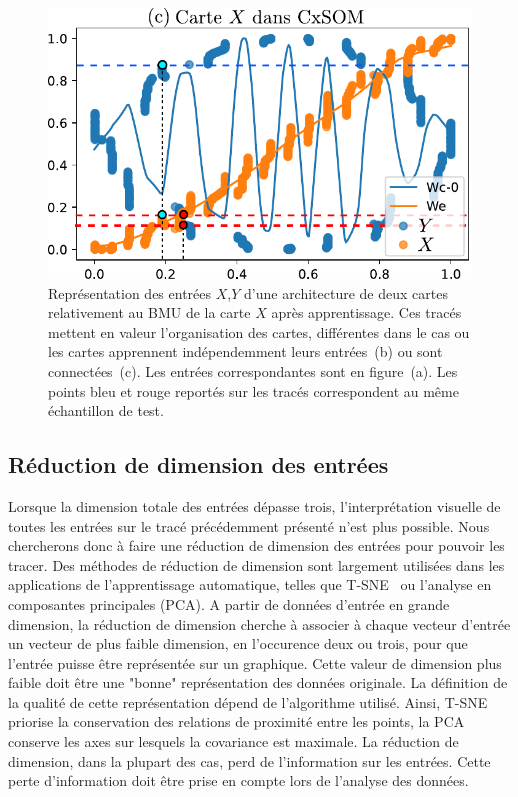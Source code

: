 \begin{figure}
\begin{minipage}{0.38\textwidth}
\includegraphics[width=\textwidth]{weights_2som.pdf}
\end{minipage}

\caption{Représentation des entrées $X$,$Y$ d'une architecture de deux cartes relativement au BMU de la carte $X$ après apprentissage. Ces tracés mettent en valeur l'organisation des cartes, différentes dans le cas ou les cartes apprennent indépendemment leurs entrées~(b) ou sont connectées~(c). Les entrées correspondantes sont en figure~(a). Les points bleu et rouge reportés sur les tracés correspondent au même échantillon de test.\label{fig:inputs}}
\end{figure}

\subsection{Réduction de dimension des entrées}

Lorsque la dimension totale des entrées dépasse trois, l'interprétation visuelle de toutes les entrées sur le tracé précédemment présenté n'est plus possible. Nous chercherons donc à faire une réduction de dimension des entrées pour pouvoir les tracer. Des méthodes de réduction de dimension sont largement utilisées dans les applications de l'apprentissage automatique, telles que T-SNE~\cite{Maaten2008VisualizingDU} ou  l'analyse en composantes principales (PCA).
A partir de données d'entrée en grande dimension, la réduction de dimension cherche à associer à chaque vecteur d'entrée un vecteur de plus faible dimension, en l'occurence deux ou trois, pour que l'entrée puisse être représentée sur un graphique. Cette valeur de dimension plus faible doit être une "bonne" représentation des données originale. La définition de la qualité de cette représentation dépend de l'algorithme utilisé. Ainsi, T-SNE priorise la conservation des relations de proximité entre les points, la PCA conserve les axes sur lesquels la covariance est maximale.
La réduction de dimension, dans la plupart des cas, perd de l'information sur les entrées.
Cette perte d'information doit être prise en compte lors de l'analyse des données.

